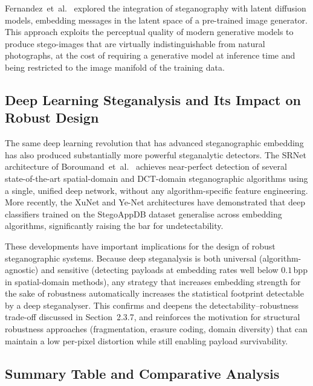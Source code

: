 \documentclass[12pt,a4paper,oneside]{report}
\begin{document}
	Fernandez~et~al.\ \cite{fernandez2023stable} explored the integration of steganography with
	latent diffusion models, embedding messages in the latent space of a pre-trained image
	generator. This approach exploits the perceptual quality of modern generative models to produce
	stego-images that are virtually indistinguishable from natural photographs, at the cost of
	requiring a generative model at inference time and being restricted to the image manifold of
	the training data.
	
	\subsection{Deep Learning Steganalysis and Its Impact on Robust Design}
	\label{subsec:dl_steganalysis}
	
	The same deep learning revolution that has advanced steganographic embedding has also produced
	substantially more powerful steganalytic detectors. The SRNet architecture of Boroumand~et~al.\
	\cite{boroumand2019deep} achieves near-perfect detection of several state-of-the-art spatial-domain
	and DCT-domain steganographic algorithms using a single, unified deep network, without any
	algorithm-specific feature engineering. More recently, the XuNet \cite{xu2016structural} and
	Ye-Net \cite{yedroudj2018yenet} architectures have demonstrated that deep classifiers trained on
	the StegoAppDB dataset generalise across embedding algorithms, significantly raising the bar for
	undetectability.
	
	These developments have important implications for the design of robust steganographic systems.
	Because deep steganalysis is both universal (algorithm-agnostic) and sensitive (detecting payloads
	at embedding rates well below $0.1$\,bpp in spatial-domain methods), any strategy that increases
	embedding strength for the sake of robustness automatically increases the statistical footprint
	detectable by a deep steganalyser. This confirms and deepens the detectability--robustness
	trade-off discussed in Section~2.3.7, and reinforces the motivation for structural robustness
	approaches (fragmentation, erasure coding, domain diversity) that can maintain a low per-pixel
	distortion while still enabling payload survivability.
	
	\subsection{Summary Table and Comparative Analysis}
	\label{subsec:dl_summary_table}
	
\end{document}
